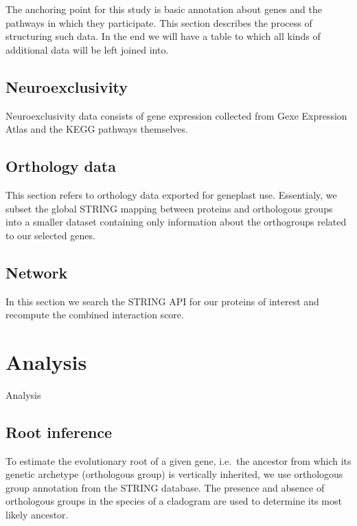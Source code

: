 \documentclass[
]{article}
\begin{document}
The anchoring point for this study is basic annotation about genes and
the pathways in which they participate. This section describes the
process of structuring such data. In the end we will have a table to
which all kinds of additional data will be left joined into.


\hypertarget{neuroexclusivity}{%
\subsection{Neuroexclusivity}\label{neuroexclusivity}}

Neuroexclusivity data consists of gene expression collected from Gexe
Expression Atlas and the KEGG pathways themselves.


\hypertarget{orthology-data}{%
\subsection{Orthology data}\label{orthology-data}}

This section refers to orthology data exported for geneplast use.
Essentialy, we subset the global STRING mapping between proteins and
orthologous groups into a smaller dataset containing only information
about the orthogroups related to our selected genes.


\hypertarget{network}{%
\subsection{Network}\label{network}}

In this section we search the STRING API for our proteins of interest
and recompute the combined interaction score.


\hypertarget{analysis}{%
\section{Analysis}\label{analysis}}

Analysis

\hypertarget{root-inference}{%
\subsection{Root inference}\label{root-inference}}

To estimate the evolutionary root of a given gene, i.e.~the ancestor
from which its genetic archetype (orthologous group) is vertically
inherited, we use orthologous group annotation from the STRING database.
The presence and absence of orthologous groups in the species of a
cladogram are used to determine its most likely ancestor.

\end{document}
